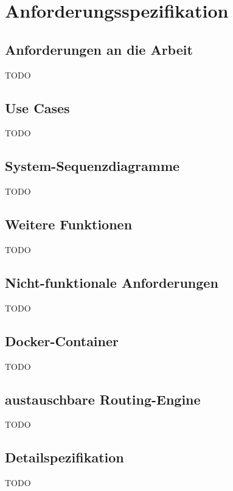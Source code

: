 
\section{Anforderungsspezifikation}
\label{sec:Anforderungsspezifikation}


\subsection{Anforderungen an die Arbeit}
\label{sub:Anforderungen an die Arbeit}

TODO

\subsection{Use Cases}
\label{sub:Use Cases}

TODO

\subsection{System-Sequenzdiagramme}
\label{sub:System-Sequenzdiagramme}

TODO

\subsection{Weitere Funktionen}
\label{sub:Weitere Funktionen}

TODO

\subsection{Nicht-funktionale Anforderungen}
\label{sub:Nicht-funktionale Anforderungen}

TODO

\subsection{Docker-Container}
\label{nfa:Docker-Container}

TODO

\subsection{austauschbare Routing-Engine}
\label{nfa:austauschbare Routing-Engine}

TODO

\subsection{Detailspezifikation}
\label{sub:Detailspezifikation}

TODO